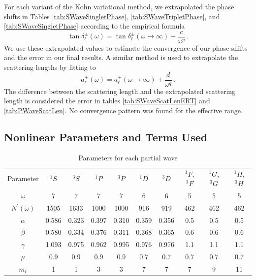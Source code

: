 \documentclass[preprint,showpacs,preprintnumbers,amsmath,amssymb]{revtex4}
\begin{document}
For each variant of the Kohn variational method, we extrapolated the phase shifts in Tables \ref{tab:SWaveSingletPhase}, \ref{tab:SWaveTripletPhase}, and \ref{tab:SWaveSingletPhase} according to the empirical formula \cite{VanReeth2003}
\begin{equation}
\label{eq:Extrap}
\tan\delta_\ell^\pm(\omega) = \tan\delta_\ell^\pm(\omega\to\infty) + \frac{c}{\omega^p}\, .
\end{equation}
We use these extrapolated values to estimate the convergence of our phase shifts and the error in our final results.
A similar method is used to extrapolate the scattering lengths by fitting to
\begin{equation}
\label{eq:ExtrapA}
a_\ell^\pm(\omega) = a_\ell^\pm(\omega\to\infty) + \frac{d}{\omega^q}\, .
\end{equation}
The difference between the scattering length and the extrapolated scattering length is considered the error in tables \ref{tab:SWaveScatLenERT} and \ref{tab:PWaveScatLen}. No convergence pattern was found for the effective range.


\subsection{Nonlinear Parameters and Terms Used}
\label{sec:Parameters}

\begin{table}[H]
  \centering
	\begin{ruledtabular}
    \begin{tabular}{cccccccccc}
    Parameter & $^1S$ & $^3S$ & $^1P$ & $^3P$ & $^1D$ & $^3D$ & $^1F$, $^3F$ & $^1G$, $^3G$ & $^1H$, $^3H$ \\
    \colrule
	$\omega$           & 7     & 7     & 7     & 7     & 6     & 6     & 5    & 5   & 5 \\
	$N^\prime(\omega)$ & 1505  & 1633  & 1000  & 1000  & 916   & 919   & 462  & 462 & 462 \\
	$\alpha$           & 0.586 & 0.323 & 0.397 & 0.310 & 0.359 & 0.356 & 0.5  & 0.5 & 0.5 \\
	$\beta$            & 0.580 & 0.334 & 0.376 & 0.311 & 0.368 & 0.365 & 0.6  & 0.6 & 0.6 \\
	$\gamma$           & 1.093 & 0.975 & 0.962 & 0.995 & 0.976 & 0.976 & 1.1  & 1.1 & 1.1 \\
	$\mu$              & 0.9   & 0.9   & 0.9   & 0.9   & 0.7   & 0.7   & 0.7  & 0.7 & 0.7 \\
	$m_\ell$           & 1     & 1     & 3     & 3     & 7     & 7     & 7    & 9   & 11 \\
    \end{tabular}
  \end{ruledtabular}
  \caption{Parameters for each partial wave}
  \label{tab:Nonlinear}
\end{table}
\end{document}
